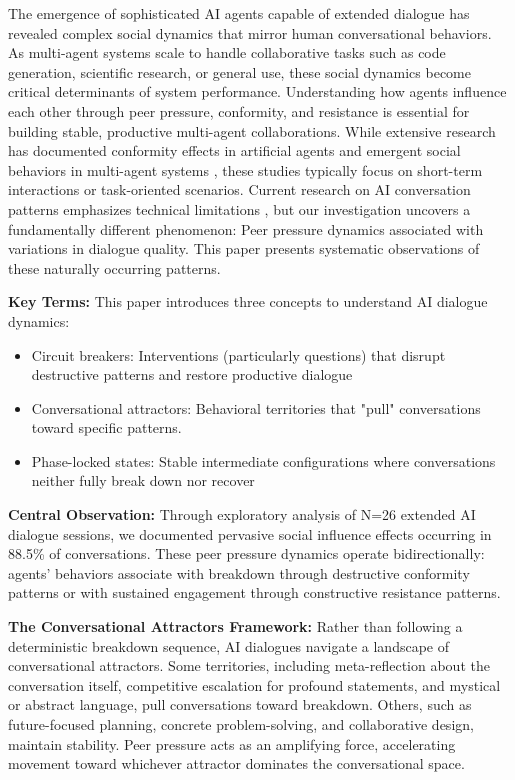 \documentclass[11pt,letterpaper]{article}
\newcommand{\exponedataTotalSessionsRaw}{26}
\newcommand{\exponedataTotalSessions}{N=\exponedataTotalSessionsRaw}
\newcommand{\exponedataPeerPressurePercentage}{88.5\%}
\begin{document}
The emergence of sophisticated AI agents capable of extended dialogue has revealed complex social dynamics that mirror human conversational behaviors. As multi-agent systems scale to handle collaborative tasks such as code generation, scientific research, or general use, these social dynamics become critical determinants of system performance. Understanding how agents influence each other through peer pressure, conformity, and resistance is essential for building stable, productive multi-agent collaborations. While extensive research has documented conformity effects in artificial agents \citep{kyrlitsias2018conformity} and emergent social behaviors in multi-agent systems \citep{ashery2025emergent}, these studies typically focus on short-term interactions or task-oriented scenarios. Current research on AI conversation patterns emphasizes technical limitations \citep{laban2025lost}, but our investigation uncovers a fundamentally different phenomenon: Peer pressure dynamics associated with variations in dialogue quality. This paper presents systematic observations of these naturally occurring patterns.

\textbf{Key Terms:} This paper introduces three concepts to understand AI dialogue dynamics:
\begin{itemize}
    \item Circuit breakers: Interventions (particularly questions) that disrupt destructive patterns and restore productive dialogue
    \item Conversational attractors: Behavioral territories that "pull" conversations toward specific patterns. 
    \item Phase-locked states: Stable intermediate configurations where conversations neither fully break down nor recover
\end{itemize}

\textbf{Central Observation:} Through exploratory analysis of \exponedataTotalSessions{} extended AI dialogue sessions, we documented pervasive social influence effects occurring in \exponedataPeerPressurePercentage{} of conversations. These peer pressure dynamics operate bidirectionally: agents' behaviors associate with breakdown through destructive conformity patterns or with sustained engagement through constructive resistance patterns.

\textbf{The Conversational Attractors Framework:} Rather than following a deterministic breakdown sequence, AI dialogues navigate a landscape of conversational attractors. Some territories, including meta-reflection about the conversation itself, competitive escalation for profound statements, and mystical or abstract language, pull conversations toward breakdown. Others, such as future-focused planning, concrete problem-solving, and collaborative design, maintain stability. Peer pressure acts as an amplifying force, accelerating movement toward whichever attractor dominates the conversational space.
\end{document}
